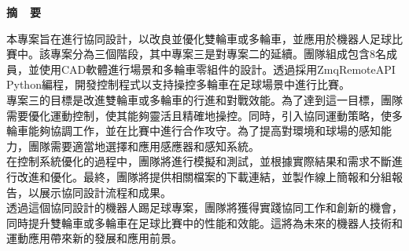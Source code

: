 ﻿\renewcommand{\baselinestretch}{1.5} %
\clearpage  %
\sectionef
{} %
\begin{center}
\LARGE\textbf{摘~~要}\\
\end{center}
\begin{flushleft}
\fontsize{14pt}{20pt}\sectionef\hspace{12pt}\quad 本專案旨在進行協同設計，以改良並優化雙輪車或多輪車，並應用於機器人足球比賽中。該專案分為三個階段，其中專案三是對專案二的延續。團隊組成包含8名成員，並使用CAD軟體進行場景和多輪車零組件的設計。透過採用ZmqRemoteAPI Python編程，開發控制程式以支持操控多輪車在足球場景中進行比賽。\\[12pt]

\fontsize{14pt}{20pt}\sectionef\hspace{12pt}\quad 專案三的目標是改進雙輪車或多輪車的行進和對戰效能。為了達到這一目標，團隊需要優化運動控制，使其能夠靈活且精確地操控。同時，引入協同運動策略，使多輪車能夠協調工作，並在比賽中進行合作攻守。為了提高對環境和球場的感知能力，團隊需要適當地選擇和應用感應器和感知系統。\\[12pt]

\fontsize{14pt}{20pt}\sectionef\hspace{12pt}\quad 在控制系統優化的過程中，團隊將進行模擬和測試，並根據實際結果和需求不斷進行改進和優化。最終，團隊將提供相關檔案的下載連結，並製作線上簡報和分組報告，以展示協同設計流程和成果。\\[12pt]

\fontsize{14pt}{20pt}\sectionef\hspace{12pt}\quad 透過這個協同設計的機器人踢足球專案，團隊將獲得實踐協同工作和創新的機會，同時提升雙輪車或多輪車在足球比賽中的性能和效能。這將為未來的機器人技術和運動應用帶來新的發展和應用前景。\\[12pt]
\end{flushleft}
\newpage
